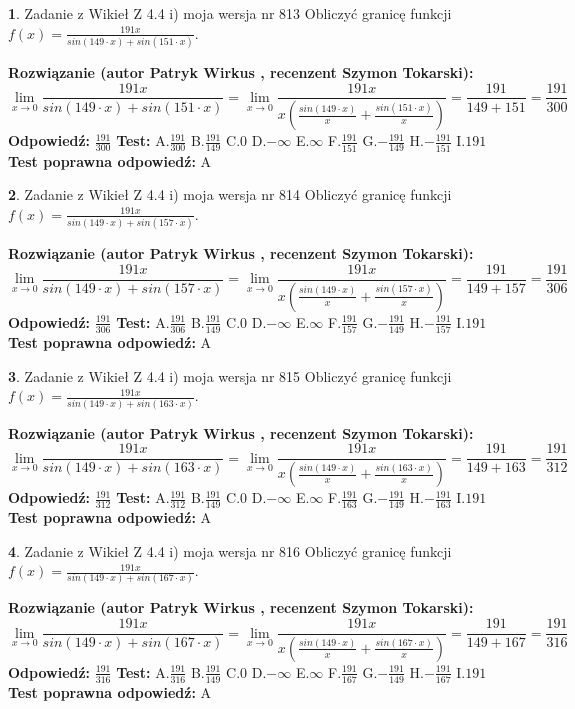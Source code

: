 \documentclass[12pt, a4paper]{article}
\theoremstyle{definition} %
\newtheorem{zad}{}
\newcommand{\zadStart}[1]{\begin{zad}#1\newline}
\newcommand{\zadStop}{\end{zad}}
\newcommand{\rozwStart}[2]{\noindent \textbf{Rozwiązanie (autor #1 , recenzent #2): }\newline}
\newcommand{\rozwStop}{\newline}
\newcommand{\odpStart}{\noindent \textbf{Odpowiedź:}\newline}
\newcommand{\odpStop}{\newline}
\newcommand{\testStart}{\noindent \textbf{Test:}\newline}
\newcommand{\testStop}{\newline}
\newcommand{\kluczStart}{\noindent \textbf{Test poprawna odpowiedź:}\newline}
\newcommand{\kluczStop}{\newline}
\begin{document}
\zadStart{Zadanie z Wikieł Z 4.4 i) moja wersja nr 813}
Obliczyć granicę funkcji $f(x)=\frac{191x}{sin(149\cdot x) +sin(151\cdot x)}$.
\zadStop
\rozwStart{Patryk Wirkus}{Szymon Tokarski}
$$\lim\limits_{x\to 0}\frac{191x}{sin(149\cdot x) +sin(151\cdot x)}=\lim\limits_{x\to 0}\frac{191x}{x(\frac{sin(149\cdot x)}{x}+\frac{sin(151\cdot x)}{x})}=\frac{191}{149+151} = \frac{191}{300}$$
\rozwStop
\odpStart
$\frac{191}{300}$
\odpStop
\testStart
A.$\frac{191}{300}$
B.$\frac{191}{149}$
C.$0$
D.$-\infty$
E.$\infty$
F.$\frac{191}{151}$
G.$-\frac{191}{149}$
H.$-\frac{191}{151}$
I.$191$
\testStop
\kluczStart
A
\kluczStop



\zadStart{Zadanie z Wikieł Z 4.4 i) moja wersja nr 814}
Obliczyć granicę funkcji $f(x)=\frac{191x}{sin(149\cdot x) +sin(157\cdot x)}$.
\zadStop
\rozwStart{Patryk Wirkus}{Szymon Tokarski}
$$\lim\limits_{x\to 0}\frac{191x}{sin(149\cdot x) +sin(157\cdot x)}=\lim\limits_{x\to 0}\frac{191x}{x(\frac{sin(149\cdot x)}{x}+\frac{sin(157\cdot x)}{x})}=\frac{191}{149+157} = \frac{191}{306}$$
\rozwStop
\odpStart
$\frac{191}{306}$
\odpStop
\testStart
A.$\frac{191}{306}$
B.$\frac{191}{149}$
C.$0$
D.$-\infty$
E.$\infty$
F.$\frac{191}{157}$
G.$-\frac{191}{149}$
H.$-\frac{191}{157}$
I.$191$
\testStop
\kluczStart
A
\kluczStop



\zadStart{Zadanie z Wikieł Z 4.4 i) moja wersja nr 815}
Obliczyć granicę funkcji $f(x)=\frac{191x}{sin(149\cdot x) +sin(163\cdot x)}$.
\zadStop
\rozwStart{Patryk Wirkus}{Szymon Tokarski}
$$\lim\limits_{x\to 0}\frac{191x}{sin(149\cdot x) +sin(163\cdot x)}=\lim\limits_{x\to 0}\frac{191x}{x(\frac{sin(149\cdot x)}{x}+\frac{sin(163\cdot x)}{x})}=\frac{191}{149+163} = \frac{191}{312}$$
\rozwStop
\odpStart
$\frac{191}{312}$
\odpStop
\testStart
A.$\frac{191}{312}$
B.$\frac{191}{149}$
C.$0$
D.$-\infty$
E.$\infty$
F.$\frac{191}{163}$
G.$-\frac{191}{149}$
H.$-\frac{191}{163}$
I.$191$
\testStop
\kluczStart
A
\kluczStop



\zadStart{Zadanie z Wikieł Z 4.4 i) moja wersja nr 816}
Obliczyć granicę funkcji $f(x)=\frac{191x}{sin(149\cdot x) +sin(167\cdot x)}$.
\zadStop
\rozwStart{Patryk Wirkus}{Szymon Tokarski}
$$\lim\limits_{x\to 0}\frac{191x}{sin(149\cdot x) +sin(167\cdot x)}=\lim\limits_{x\to 0}\frac{191x}{x(\frac{sin(149\cdot x)}{x}+\frac{sin(167\cdot x)}{x})}=\frac{191}{149+167} = \frac{191}{316}$$
\rozwStop
\odpStart
$\frac{191}{316}$
\odpStop
\testStart
A.$\frac{191}{316}$
B.$\frac{191}{149}$
C.$0$
D.$-\infty$
E.$\infty$
F.$\frac{191}{167}$
G.$-\frac{191}{149}$
H.$-\frac{191}{167}$
I.$191$
\testStop
\kluczStart
A
\kluczStop
\end{document}
